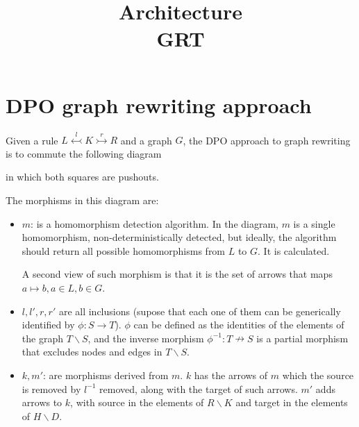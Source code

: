 \documentclass[a4paper]{report}
\title{Architecture\\GRT}
\begin{document}
\maketitle
\chapter{DPO graph rewriting approach}
Given a rule $L \overset{l}{\leftarrowtail} K \overset{r}{\rightarrowtail} R$ and a graph $G$, the DPO approach to graph rewriting is to commute the following diagram

\begin{center}
\end{center}
in which both squares are pushouts.

The morphisms in this diagram are:
\begin{itemize}
	\item $m$: is a homomorphism detection algorithm. In the diagram, $m$ is a single homomorphism, non-deterministically detected, but ideally, the algorithm should return all possible homomorphisms from $L$ to $G$. It is calculated.

	A second view of such morphism is that it is the set of arrows that maps $a \mapsto b, a \in L, b \in G$.

	\item $l, l', r, r'$ are all inclusions (supose that each one of them can be generically identified by $\phi : S \to T$). $\phi$ can be defined as the identities of the elements of the graph $T \backslash S$, and the inverse morphism $\phi^{-1}: T \nrightarrow S$ is a partial morphism that excludes nodes and edges in $T \backslash S$.

	\item $k, m'$: are morphisms derived from $m$. $k$ has the arrows of $m$ which the source is removed by $l^{-1}$ removed, along with the target of such arrows. $m'$ adds arrows to $k$, with source in the elements of $R \backslash K$ and target in the elements of $H \backslash D$.
\end{itemize}
\end{document}
